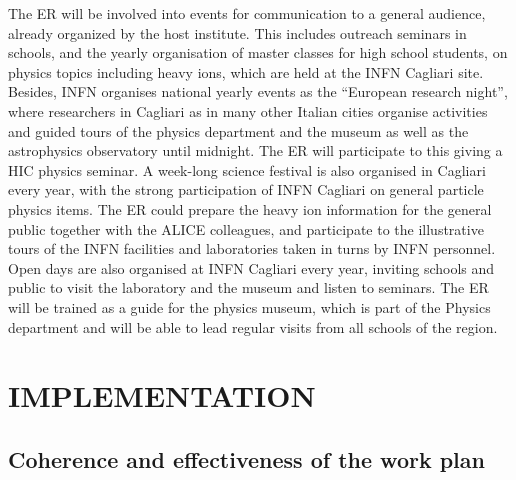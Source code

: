 \documentclass[a4paper,11pt]{article}
\newcommand{\ER}{ER\xspace}
\begin{document}
The \ER will be involved into events for communication to a general
audience, already organized by the host institute. This includes
outreach seminars in schools, and the yearly organisation of master
classes for high school students, on physics topics including heavy
ions, which are held at the INFN Cagliari site.  Besides, INFN organises 
national yearly events as the ``European research night'', where researchers
in Cagliari as in many other Italian cities organise activities and guided tours of the 
physics department and the museum as well as the 
astrophysics observatory until midnight. The \ER will participate to this giving a HIC physics seminar.
A week-long science festival is also organised in Cagliari every year, 
with the strong participation of INFN Cagliari on general particle physics 
items. The \ER could prepare the heavy ion information for the general public together with the 
ALICE colleagues, and participate to the illustrative tours of the INFN
facilities and laboratories taken in turns 
by INFN personnel. 
Open days are also organised at INFN Cagliari every year, inviting schools and
public to visit the laboratory and the museum and listen to seminars.
The \ER will be trained as a guide for the physics museum, which 
is part of the Physics department and will be able to lead regular 
visits from all schools of the region.
%        

\section{IMPLEMENTATION}
\label{sec:implementation}

%            
           
\subsection{Coherence and effectiveness of the work plan} \label{sec:WP}

\end{document}
